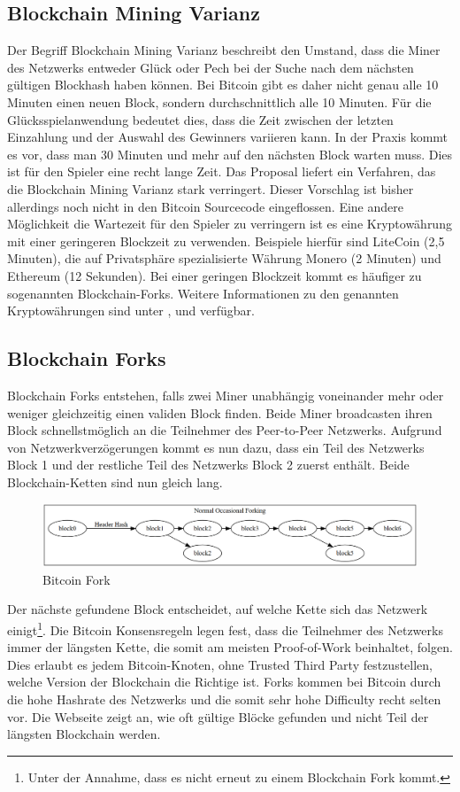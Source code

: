 \subsection{Blockchain Mining Varianz}
Der Begriff Blockchain Mining Varianz beschreibt den Umstand, dass die Miner des Netzwerks entweder Glück oder Pech bei der Suche nach dem nächsten gültigen Blockhash haben können. Bei Bitcoin gibt es daher nicht genau alle 10 Minuten einen neuen Block, sondern durchschnittlich alle 10 Minuten. Für die Glücksspielanwendung bedeutet dies, dass die Zeit zwischen der letzten Einzahlung und der Auswahl des Gewinners variieren kann. In der Praxis kommt es vor, dass man 30 Minuten und mehr auf den nächsten Block warten muss. Dies ist für den Spieler eine recht lange Zeit. Das Proposal \cite{bobtail} liefert ein Verfahren, das die Blockchain Mining Varianz stark verringert. Dieser Vorschlag ist bisher allerdings noch nicht in den Bitcoin Sourcecode eingeflossen.
Eine andere Möglichkeit die Wartezeit für den Spieler zu verringern ist es eine  Kryptowährung mit einer geringeren Blockzeit zu verwenden. Beispiele hierfür sind LiteCoin (2,5 Minuten), die auf Privatsphäre spezialisierte Währung Monero (2 Minuten) und Ethereum (12 Sekunden). Bei einer geringen Blockzeit kommt es häufiger zu sogenannten Blockchain-Forks. Weitere Informationen zu den genannten Kryptowährungen sind unter \cite{coin_ltc}, \cite{coin_xmr} und \cite{coin_eth} verfügbar.

\subsection{Blockchain Forks} \label{sssec:btc_fork}
Blockchain Forks entstehen, falls zwei Miner unabhängig voneinander mehr oder weniger gleichzeitig einen validen Block finden. Beide Miner broadcasten ihren Block schnellstmöglich an die Teilnehmer des Peer-to-Peer Netzwerks. Aufgrund von Netzwerkverzögerungen kommt es nun dazu, dass ein Teil des Netzwerks Block 1 und der restliche Teil des Netzwerks Block 2 zuerst enthält. Beide Blockchain-Ketten sind nun gleich lang.
\begin{figure}[H]
\centering
\includegraphics[width=1\linewidth]{Figures/btc/fork_normal}
\decoRule
\caption{Bitcoin Fork}
\label{fig:fork_normal}
\end{figure}
Der nächste gefundene Block entscheidet, auf welche Kette sich das Netzwerk einigt\footnote{Unter der Annahme, dass es nicht erneut zu einem Blockchain Fork kommt.}. Die Bitcoin Konsensregeln legen fest, dass die Teilnehmer des Netzwerks immer der längsten Kette, die somit am meisten Proof-of-Work beinhaltet, folgen. Dies erlaubt es jedem Bitcoin-Knoten, ohne Trusted Third Party festzustellen, welche Version der Blockchain die Richtige ist. Forks kommen bei Bitcoin durch die hohe Hashrate des Netzwerks und die somit sehr hohe Difficulty recht selten vor. Die Webseite \cite{orphaned-blocks} zeigt an, wie oft gültige Blöcke gefunden und nicht Teil der längsten Blockchain werden.

